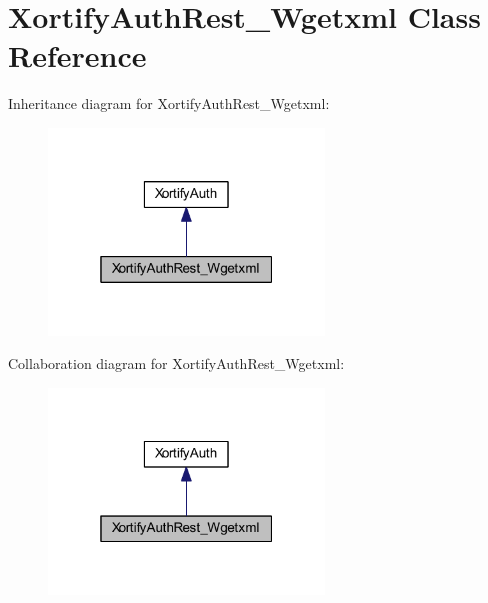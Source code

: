 \hypertarget{class_xortify_auth_rest___wgetxml}{\section{Xortify\-Auth\-Rest\-\_\-\-Wgetxml Class Reference}
\label{class_xortify_auth_rest___wgetxml}
}


Inheritance diagram for Xortify\-Auth\-Rest\-\_\-\-Wgetxml\-:
\nopagebreak
\begin{figure}[H]
\begin{center}
\leavevmode
\includegraphics[width=208pt]{class_xortify_auth_rest___wgetxml__inherit__graph}
\end{center}
\end{figure}


Collaboration diagram for Xortify\-Auth\-Rest\-\_\-\-Wgetxml\-:
\nopagebreak
\begin{figure}[H]
\begin{center}
\leavevmode
\includegraphics[width=208pt]{class_xortify_auth_rest___wgetxml__coll__graph}
\end{center}
\end{figure}
